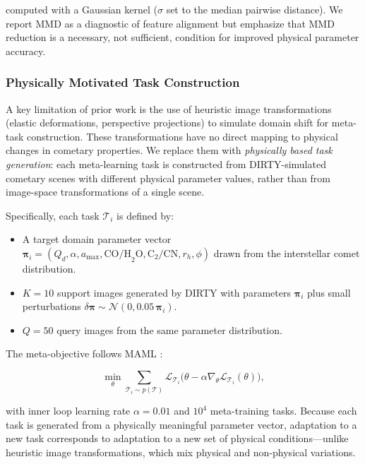 \documentclass[usenatbib]{mnras}
\begin{document}
computed with a Gaussian kernel ($\sigma$ set to the median pairwise distance). We report MMD as a diagnostic of feature alignment but emphasize that MMD reduction is a necessary, not sufficient, condition for improved physical parameter accuracy.

\subsubsection{Physically Motivated Task Construction}

A key limitation of prior work is the use of heuristic image transformations (elastic deformations, perspective projections) to simulate domain shift for meta-task construction. These transformations have no direct mapping to physical changes in cometary properties. We replace them with \textit{physically based task generation}: each meta-learning task is constructed from DIRTY-simulated cometary scenes with different physical parameter values, rather than from image-space transformations of a single scene.

Specifically, each task $\mathcal{T}_i$ is defined by:
\begin{itemize}
    \item A target domain parameter vector $\boldsymbol{\pi}_i = (Q_d, \alpha, a_{\max}, \text{CO/H}_2\text{O}, \text{C}_2/\text{CN}, r_h, \phi)$ drawn from the interstellar comet distribution.
    \item $K=10$ support images generated by DIRTY with parameters $\boldsymbol{\pi}_i$ plus small perturbations $\delta\boldsymbol{\pi} \sim \mathcal{N}(0, 0.05\,\boldsymbol{\pi}_i)$.
    \item $Q=50$ query images from the same parameter distribution.
\end{itemize}

The meta-objective follows MAML \citep{finn17}:

\begin{equation}\label{eq:maml}
\min_\theta \sum_{\mathcal{T}_i \sim p(\mathcal{T})}
\mathcal{L}_{\mathcal{T}_i}\bigl(\theta - \alpha \nabla_\theta \mathcal{L}_{\mathcal{T}_i}(\theta)\bigr),
\end{equation}

with inner loop learning rate $\alpha = 0.01$ and $10^4$ meta-training tasks. Because each task is generated from a physically meaningful parameter vector, adaptation to a new task corresponds to adaptation to a new set of physical conditions---unlike heuristic image transformations, which mix physical and non-physical variations.
\end{document}
